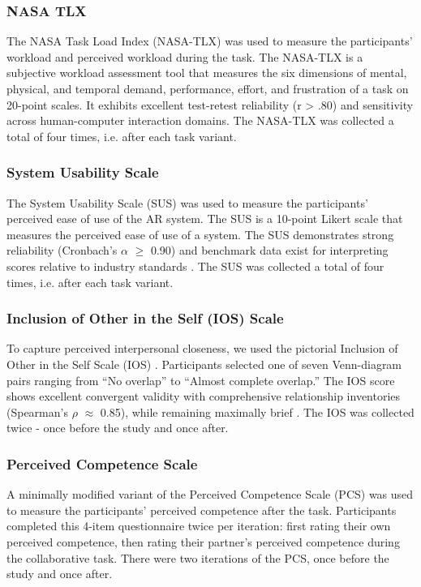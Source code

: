 \subsubsection{NASA TLX}\label{subsec:nasa_tlx}
The NASA Task Load Index (NASA-TLX) \cite{hart1988development} was used to measure the participants' workload and perceived workload during the task. The NASA-TLX is a subjective workload assessment tool that measures the six dimensions of mental, physical, and temporal demand, performance, effort, and frustration of a task on 20-point scales. It exhibits excellent test-retest reliability (r > .80) and sensitivity across human-computer interaction domains\cite{hart1988development, rubio2004evaluation}. The NASA-TLX was collected a total of four times, i.e. after each task variant.

\subsubsection{System Usability Scale}\label{subsec:su}
The System Usability Scale (SUS) \cite{brooke1996sus} was used to measure the participants' perceived ease of use of the AR system. The SUS is a 10-point Likert scale that measures the perceived ease of use of a system. The SUS demonstrates strong reliability (Cronbach's $\alpha$ $\geq$ 0.90) and benchmark data exist for interpreting scores relative to industry standards \cite{bangor2009determining}. The SUS was collected a total of four times, i.e. after each task variant.

\subsubsection{Inclusion of Other in the Self (IOS) Scale}\label{subsec:ios}
To capture perceived interpersonal closeness, we used the pictorial Inclusion of Other in the Self Scale (IOS) \cite{aron1991close}. Participants selected one of seven Venn-diagram pairs ranging from “No overlap” to “Almost complete overlap.” The IOS score shows excellent convergent validity with comprehensive relationship inventories (Spearman's $\rho$ $\approx$ 0.85), while remaining maximally brief \cite{gachter2015measuring}. The IOS was collected twice - once before the study and once after.

\subsubsection{Perceived Competence Scale}\label{subsec:perceived_competence}
A minimally modified variant of the Perceived Competence Scale (PCS) \cite{williams1998perceived} was used to measure the participants' perceived competence after the task. Participants completed this 4-item questionnaire twice per iteration: first rating their own perceived competence, then rating their partner's perceived competence during the collaborative task. There were two iterations of the PCS, once before the study and once after.

